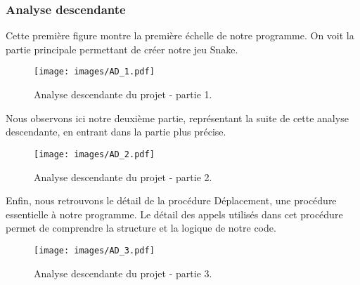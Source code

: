         \subsubsection{Analyse descendante}
            Cette première figure montre la première échelle de notre programme. On voit la partie principale permettant de créer notre jeu Snake.
            
            \begin{figure}[!ht]
            
                \centering 
                \texttt{[image: images/AD\_1.pdf]} 
                \caption{Analyse descendante du projet - partie 1.} 
                \label{fig:AD} 
                
            \end{figure}
            
            \clearpage
            \par
                Nous observons ici notre deuxième partie, représentant la suite de cette analyse descendante, en entrant dans la partie plus précise.    
            
            \begin{figure}[!ht]
            
                \centering 
                \texttt{[image: images/AD\_2.pdf]} 
                \caption{Analyse descendante du projet - partie 2.}
                \label{fig:AD} 
                
            \end{figure}
            
            \clearpage
            \par
                Enfin, nous retrouvons le détail de la procédure Déplacement, une procédure essentielle à notre programme. Le détail des appels utilisés dans cet procédure permet de comprendre la structure et la logique de notre code.
            
            \begin{figure}[!ht]
            
                \centering 
                \texttt{[image: images/AD\_3.pdf]} 
                \caption{Analyse descendante du projet - partie 3.} 
                \label{fig:AD} 
                
            \end{figure}    
        
        \clearpage
    
